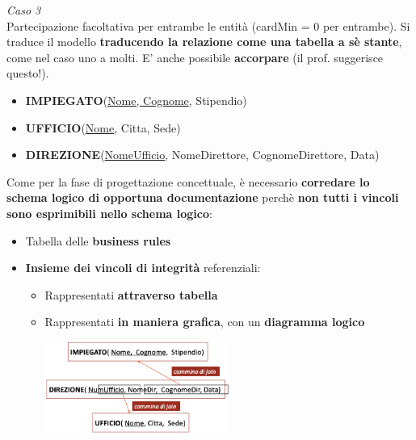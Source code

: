 \documentclass{article}
\begin{document}
\textit{Caso 3}\\
Partecipazione facoltativa per entrambe le entità (cardMin = 0 per entrambe). Si traduce il modello \textbf{traducendo la relazione come una tabella a sè stante}, come nel caso uno a molti. E' anche possibile \textbf{accorpare} (il prof. suggerisce questo!).
\begin{itemize}[label={ }, leftmargin=1cm]
    \item \textbf{IMPIEGATO}(\underline{Nome, Cognome}, Stipendio)
    \item \textbf{UFFICIO}(\underline{Nome}, Citta, Sede)
    \item \textbf{DIREZIONE}(\underline{NomeUfficio}, NomeDirettore, CognomeDirettore, Data)\vspace{100pt}\\
\end{itemize}
Come per la fase di progettazione concettuale, è necessario \textbf{corredare lo schema logico di opportuna documentazione} perchè \textbf{non tutti i vincoli sono esprimibili nello schema logico}:
\begin{itemize}[label={-}, leftmargin=1cm]
    \item Tabella delle \textbf{business rules}
    \item \textbf{Insieme dei vincoli di integrità} referenziali:
    \begin{itemize}[label={-}, leftmargin=1cm]
        \item Rappresentati \textbf{attraverso tabella}
        \item Rappresentati \textbf{in maniera grafica}, con un \textbf{diagramma logico}
        \begin{center}
            \includegraphics[width=0.5\textwidth]{foto 19.png}
        \end{center}
    \end{itemize}
\end{itemize}
\end{document}
